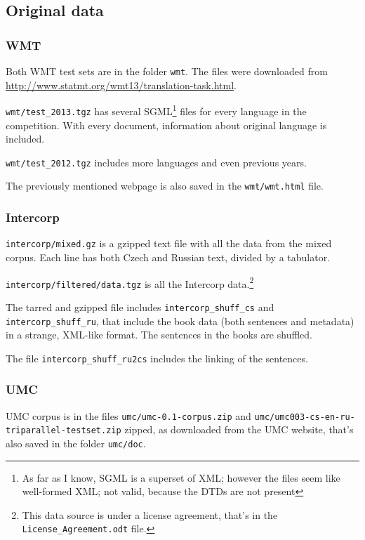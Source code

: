 \subsection{Original data}
\subsubsection{WMT}
Both WMT test sets are in the folder \texttt{wmt}. The files were downloaded from \url{http://www.statmt.org/wmt13/translation-task.html}.

\texttt{wmt/test\_2013.tgz} has several SGML\footnote{As far as I know, SGML is a superset of XML; however the files seem like well-formed XML; not valid, because the DTDs are not present} files for every language in the competition. With every document, information about original language is included.

\texttt{wmt/test\_2012.tgz} includes more languages and even previous years.

The previously mentioned webpage is also saved in the \texttt{wmt/wmt.html} file.
\subsubsection{Intercorp}
\texttt{intercorp/mixed.gz} is a gzipped text file with all the data from the mixed corpus. Each line has both Czech and Russian text, divided by a tabulator.

\texttt{intercorp/filtered/data.tgz} is all the Intercorp data.\footnote{This data source is under a license agreement, that's in the \texttt{License\_Agreement.odt} file.}

The tarred and gzipped file includes \texttt{intercorp\_shuff\_cs} and \texttt{intercorp\allowbreak \_shuff\allowbreak \_ru}, that include the book data (both sentences and metadata) in a strange, XML-like format. The sentences in the books are shuffled.

The file \texttt{intercorp\_shuff\_ru2cs} includes the linking of the sentences.

\subsubsection{UMC}
UMC corpus is in the files \texttt{umc/umc-0.1-corpus.zip} and \texttt{umc/\allowbreak umc003-\allowbreak cs-\allowbreak en-\allowbreak ru-\allowbreak triparallel-testset.zip} zipped, as downloaded from the UMC website, that's also saved in the folder \texttt{umc/doc}.


